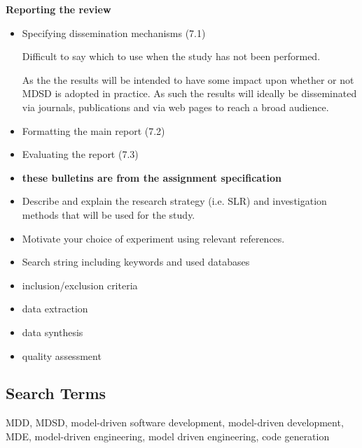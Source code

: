 \documentclass[10pt,twocolumn]{article}
\begin{document}
\textbf{Reporting the review}
\begin{itemize}
\item Specifying dissemination mechanisms (7.1)

Difficult to say which to use when the study has not been performed.

As the the results will be intended to have some impact upon whether or not MDSD is adopted in practice. As such the results will ideally be disseminated via journals, publications and via web pages to reach a broad audience.

\item Formatting the main report (7.2)
\item Evaluating the report (7.3)
\end{itemize} 






\begin{itemize}
\item \textbf{these bulletins are from the assignment specification}
\item Describe and explain the research strategy (i.e. SLR) and investigation methods that will be used for the study. 
\item Motivate your choice of experiment using relevant references. 
\item Search string including keywords and used databases
\item inclusion/exclusion criteria
\item data extraction
\item data synthesis
\item quality assessment
\end{itemize}

\begin{appendices}
\section{Search Terms}
MDD, MDSD, model-driven software development, model-driven development, MDE, model-driven engineering, model driven engineering, code generation
\end{appendices}
\end{document}

